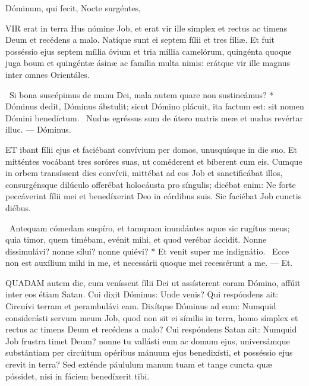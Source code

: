 



 Dóminum, qui fecit,  Nocte surgéntes, 




\lettrine[lines=2]{V}{IR} erat in terra Hus nómine Job, et erat vir ille simplex et rectus ac timens Deum et recédens a malo. Natíque sunt ei septem fílii et tres fíliæ. Et fuit posséssio ejus septem míllia óvium et tria míllia camelórum, quingénta quoque juga boum et quingéntæ ásinæ ac família multa nimis: erátque vir ille magnus inter omnes Orientáles.

\R\ Si bona suscépimus de manu Dei, mala autem quare non sustineámus? * Dóminus dedit, Dóminus ábstulit; sicut Dómino plácuit, ita factum est: sit nomen Dómini benedíctum. \V\ Nudus egréssus sum de útero matris meæ et nudus revértar illuc. — Dóminus.


\lettrine[lines=2]{E}{T} ibant fílii ejus et faciébant convívium per domos, unusquísque in die suo. Et mitténtes vocábant tres soróres suas, ut coméderent et bíberent cum eis. Cumque in orbem transíssent dies convívii, mittébat ad eos Job et sanctificábat illos, consurgénsque dilúculo offerébat holocáusta pro síngulis; dicébat enim: Ne forte peccáverint fílii mei et benedíxerint Deo in córdibus suis. Sic faciébat Job cunctis diébus.

\R\ Antequam cómedam suspíro, et tamquam inundántes aquæ sic rugítus meus; quia timor, quem timébam, evénit mihi, et quod verébar áccidit. Nonne dissimulávi? nonne sílui? nonne quiévi? * Et venit super me indignátio. \V\ Ecce non est auxílium mihi in me, et necessárii quoque mei recessérunt a me. — Et.


\lettrine[lines=2]{Q}{UADAM} autem die, cum veníssent fílii Dei ut assísterent coram Dómino, affúit inter eos étiam Satan. Cui dixit Dóminus: Unde venis? Qui respóndens ait: Circuívi terram et perambulávi eam. Dixítque Dóminus ad eum: Numquid considerásti servum meum Job, quod non sit ei símilis in terra, homo símplex et rectus ac timens Deum et recédens a malo? Cui respóndens Satan ait: Numquid Job frustra timet Deum? nonne tu vallásti eum ac domum ejus, universámque substántiam per circúitum opéribus mánuum ejus benedixísti, et posséssio ejus crevit in terra? Sed exténde páululum manum tuam et tange cuncta quæ póssidet, nisi in fáciem benedíxerit tibi.

